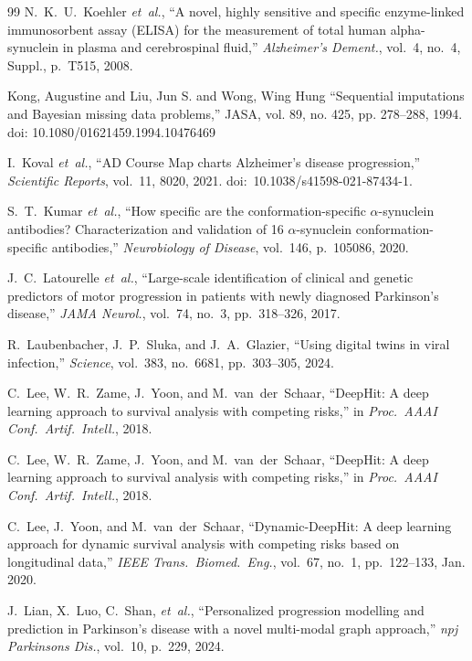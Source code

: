 \begin{thebibliography}{99}
N.~K.~U.~Koehler \textit{et~al.}, ``A novel, highly sensitive and specific enzyme-linked immunosorbent assay (ELISA) for the measurement of total human alpha-synuclein in plasma and cerebrospinal fluid,'' \textit{Alzheimer's Dement.}, vol.~4, no.~4, Suppl., p.~T515, 2008.


 Kong, Augustine and Liu, Jun S. and Wong, Wing Hung ``Sequential imputations and Bayesian missing data problems,'' JASA, vol. 89, no. 425, pp. 278--288, 1994. doi: 10.1080/01621459.1994.10476469

I.~Koval \textit{et~al.}, ``AD Course Map charts Alzheimer's disease progression,'' \textit{Scientific Reports}, vol.~11, 8020, 2021. doi:~10.1038/s41598-021-87434-1.

S.~T.~Kumar \textit{et~al.}, ``How specific are the conformation-specific $\alpha$-synuclein antibodies? Characterization and validation of 16 $\alpha$-synuclein conformation-specific antibodies,'' \textit{Neurobiology of Disease}, vol.~146, p.~105086, 2020.

J.~C.~Latourelle \textit{et~al.}, ``Large-scale identification of clinical and genetic predictors of motor progression in patients with newly diagnosed Parkinson's disease,'' \textit{JAMA Neurol.}, vol.~74, no.~3, pp.~318--326, 2017.

R.~Laubenbacher, J.~P.~Sluka, and J.~A.~Glazier, ``Using digital twins in viral infection,'' \textit{Science}, vol.~383, no.~6681, pp.~303--305, 2024.

C.~Lee, W.~R.~Zame, J.~Yoon, and M.~van~der~Schaar, ``DeepHit: A deep learning approach to survival analysis with competing risks,'' in \textit{Proc.\ AAAI Conf.\ Artif.\ Intell.}, 2018.

C.~Lee, W.~R.~Zame, J.~Yoon, and M.~van~der~Schaar, ``DeepHit: A deep learning approach to survival analysis with competing risks,'' in \textit{Proc.\ AAAI Conf.\ Artif.\ Intell.}, 2018.

C.~Lee, J.~Yoon, and M.~van~der~Schaar, ``Dynamic-DeepHit: A deep learning approach for dynamic survival analysis with competing risks based on longitudinal data,'' \textit{IEEE Trans.\ Biomed.\ Eng.}, vol.~67, no.~1, pp.~122--133, Jan. 2020.

J.~Lian, X.~Luo, C.~Shan, \textit{et~al.}, ``Personalized progression modelling and prediction in Parkinson's disease with a novel multi-modal graph approach,'' \textit{npj Parkinsons Dis.}, vol.~10, p.~229, 2024.


\end{thebibliography}

